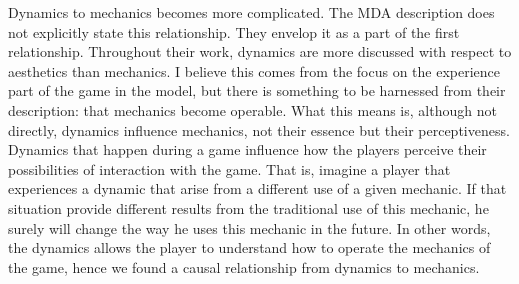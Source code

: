 Dynamics to mechanics becomes more complicated. The MDA description does not explicitly state this relationship. They envelop it as a part of the first relationship. Throughout their work, dynamics are more discussed with respect to aesthetics than mechanics. I believe this comes from the focus on the experience part of the game in the model, but there is something to be harnessed from their description: that mechanics become operable. What this means is, although not directly, dynamics influence mechanics, not their essence but their perceptiveness. Dynamics that happen during a game influence how the players perceive their possibilities of interaction with the game. That is, imagine a player that experiences a dynamic that arise from a different use of a given mechanic. If that situation provide different results from the traditional use of this mechanic, he surely will change the way he uses this mechanic in the future. In other words, the dynamics allows the player to understand how to operate the mechanics of the game, hence we found a causal relationship from dynamics to mechanics.
